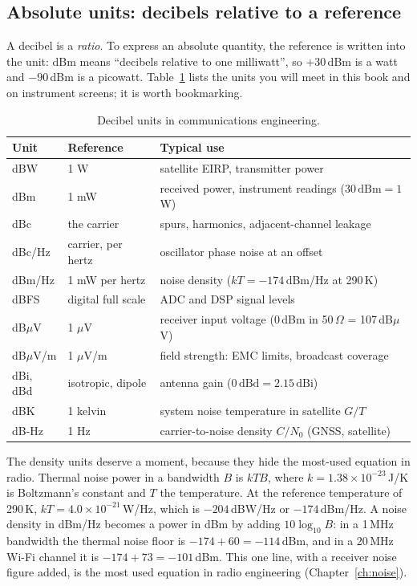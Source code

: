 \subsection{Absolute units: decibels relative to a reference}

A decibel is a \emph{ratio}. To express an absolute quantity, the reference is written into the
unit: dBm means ``decibels relative to one milliwatt'', so $+30$\,dBm is a watt and $-90$\,dBm is a
picowatt. Table~\ref{tab:ch02:dbunits} lists the units you will meet in this book and on instrument
screens; it is worth bookmarking.

\begin{table}[htbp]\centering\small
\caption{Decibel units in communications engineering.}\label{tab:ch02:dbunits}
\begin{tabular}{@{}lll@{}}
\toprule
Unit & Reference & Typical use\\
\midrule
dBW & 1 W & satellite EIRP, transmitter power \\
dBm & 1 mW & received power, instrument readings ($30\,\text{dBm}=1$\,W)\\
dBc & the carrier & spurs, harmonics, adjacent-channel leakage\\
dBc/Hz & carrier, per hertz & oscillator phase noise at an offset\\
dBm/Hz & 1 mW per hertz & noise density ($kT=-174$\,dBm/Hz at 290\,K)\\
dBFS & digital full scale & ADC and DSP signal levels\\
dB$\mu$V & 1 $\mu$V & receiver input voltage (0\,dBm in 50\,$\Omega$ = 107\,dB$\mu$V)\\
dB$\mu$V/m & 1 $\mu$V/m & field strength: EMC limits, broadcast coverage\\
dBi, dBd & isotropic, dipole & antenna gain ($0\,\text{dBd}=2.15\,\text{dBi}$)\\
dBK & 1 kelvin & system noise temperature in satellite $G/T$\\
dB-Hz & 1 Hz & carrier-to-noise density $C/N_0$ (GNSS, satellite)\\
\bottomrule
\end{tabular}
\end{table}

The density units deserve a moment, because they hide the most-used equation in radio. Thermal
noise power in a bandwidth $B$ is $kTB$, where $k=1.38\times10^{-23}$\,J/K is Boltzmann's constant
and $T$ the temperature. At the reference temperature of 290\,K, $kT=4.0\times10^{-21}$\,W/Hz,
which is $-204$\,dBW/Hz or $-174$\,dBm/Hz. A noise density in dBm/Hz becomes a power in dBm by
adding $10\log_{10}B$: in a 1\,MHz bandwidth the thermal noise floor is $-174+60=-114$\,dBm, and in a
20\,MHz Wi-Fi channel it is $-174+73=-101$\,dBm. This one line, with a receiver noise figure added,
is the most used equation in radio engineering (Chapter~\ref{ch:noise}).

